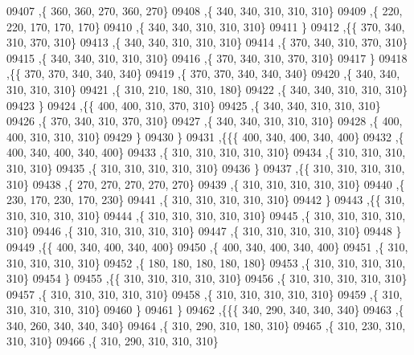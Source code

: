 \begin{DoxyCode}
09407     ,\{   360,   360,   270,   360,   270\}
09408     ,\{   340,   340,   310,   310,   310\}
09409     ,\{   220,   220,   170,   170,   170\}
09410     ,\{   340,   340,   310,   310,   310\}
09411     \}
09412    ,\{\{   370,   340,   310,   370,   310\}
09413     ,\{   340,   340,   310,   310,   310\}
09414     ,\{   370,   340,   310,   370,   310\}
09415     ,\{   340,   340,   310,   310,   310\}
09416     ,\{   370,   340,   310,   370,   310\}
09417     \}
09418    ,\{\{   370,   370,   340,   340,   340\}
09419     ,\{   370,   370,   340,   340,   340\}
09420     ,\{   340,   340,   310,   310,   310\}
09421     ,\{   310,   210,   180,   310,   180\}
09422     ,\{   340,   340,   310,   310,   310\}
09423     \}
09424    ,\{\{   400,   400,   310,   370,   310\}
09425     ,\{   340,   340,   310,   310,   310\}
09426     ,\{   370,   340,   310,   370,   310\}
09427     ,\{   340,   340,   310,   310,   310\}
09428     ,\{   400,   400,   310,   310,   310\}
09429     \}
09430    \}
09431   ,\{\{\{   400,   340,   400,   340,   400\}
09432     ,\{   400,   340,   400,   340,   400\}
09433     ,\{   310,   310,   310,   310,   310\}
09434     ,\{   310,   310,   310,   310,   310\}
09435     ,\{   310,   310,   310,   310,   310\}
09436     \}
09437    ,\{\{   310,   310,   310,   310,   310\}
09438     ,\{   270,   270,   270,   270,   270\}
09439     ,\{   310,   310,   310,   310,   310\}
09440     ,\{   230,   170,   230,   170,   230\}
09441     ,\{   310,   310,   310,   310,   310\}
09442     \}
09443    ,\{\{   310,   310,   310,   310,   310\}
09444     ,\{   310,   310,   310,   310,   310\}
09445     ,\{   310,   310,   310,   310,   310\}
09446     ,\{   310,   310,   310,   310,   310\}
09447     ,\{   310,   310,   310,   310,   310\}
09448     \}
09449    ,\{\{   400,   340,   400,   340,   400\}
09450     ,\{   400,   340,   400,   340,   400\}
09451     ,\{   310,   310,   310,   310,   310\}
09452     ,\{   180,   180,   180,   180,   180\}
09453     ,\{   310,   310,   310,   310,   310\}
09454     \}
09455    ,\{\{   310,   310,   310,   310,   310\}
09456     ,\{   310,   310,   310,   310,   310\}
09457     ,\{   310,   310,   310,   310,   310\}
09458     ,\{   310,   310,   310,   310,   310\}
09459     ,\{   310,   310,   310,   310,   310\}
09460     \}
09461    \}
09462   ,\{\{\{   340,   290,   340,   340,   340\}
09463     ,\{   340,   260,   340,   340,   340\}
09464     ,\{   310,   290,   310,   180,   310\}
09465     ,\{   310,   230,   310,   310,   310\}
09466     ,\{   310,   290,   310,   310,   310\}

\end{DoxyCode}
